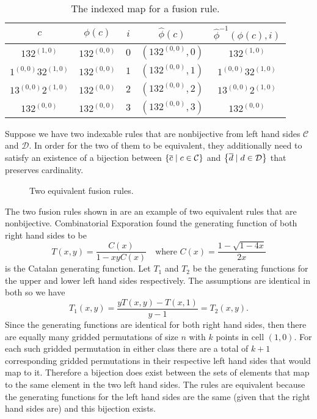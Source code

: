 \begin{table}[ht!]
    \centering
    \begin{tabular}{c|c|c|c|c}
        $c$ & $\phi(c)$ & $i$ & $\hat{\phi}(c)$ & $\hat{\phi}^{-1}(\phi(c),i)$\\
        \hline
        $132^{(1,0)}$ & $132^{(0,0)}$ & $0$ & $\left(132^{(0,0)}, 0\right)$ & $132^{(1,0)}$ \\
        $1^{(0,0)}32^{(1,0)}$ & $132^{(0,0)}$ & $1$ & $\left(132^{(0,0)}, 1\right)$ & $1^{(0,0)}32^{(1,0)}$ \\
        $13^{(0,0)}2^{(1,0)}$ & $132^{(0,0)}$ & $2$ & $\left(132^{(0,0)}, 2\right)$ & $13^{(0,0)}2^{(1,0)}$\\
        $132^{(0,0)}$ & $132^{(0,0)}$ & $3$ & $\left(132^{(0,0)}, 3\right)$ & $132^{(0,0)}$
    \end{tabular}
    \caption{The indexed map for a fusion rule.}
    \label{tab:fuseidxmap}
\end{table}

Suppose we have two indexable rules that are nonbijective from left hand sides $\mathcal{C}$ and $\mathcal{D}$. In order for the two of them to be equivalent, they additionally need to satisfy an existence of a bijection between $\left\{\overline{c} \mid c \in \mathcal{C}\right\}$ and $\left\{\overline{d} \mid d \in \mathcal{D}\right\}$ that preserves cardinality.

\begin{figure}[ht!]
    \centering
    
    \caption{Two equivalent fusion rules.}
    \label{fig:fuseq}
\end{figure}

The two fusion rules shown in  are an example of two equivalent rules that are nonbijective.  Combinatorial Exporation found the generating function of both right hand sides to be
\[
    T(x,y) = \frac{C(x)}{1-xyC(x)}\quad\text{where } C(x) = \frac{1-\sqrt{1-4x}}{2x}
\]
is the Catalan generating function. Let $T_1$ and $T_2$ be the generating functions for the upper and lower left hand sides respectively. The assumptions are identical in both so we have
\[
    T_1(x,y) = \frac{yT(x,y)-T(x,1)}{y-1} = T_2(x,y).
\]
Since the generating functions are identical for both right hand sides, then there are equally many gridded permutations of size $n$ with $k$ points in cell $(1,0)$. For each such gridded permutation in either class there are a total of $k+1$ corresponding gridded permutations in their respective left hand sides that would map to it. Therefore a bijection does exist between the sets of elements that map to the same element in the two left hand sides. The rules are equivalent because the generating functions for the left hand sides are the same (given that the right hand sides are) and this bijection exists.

